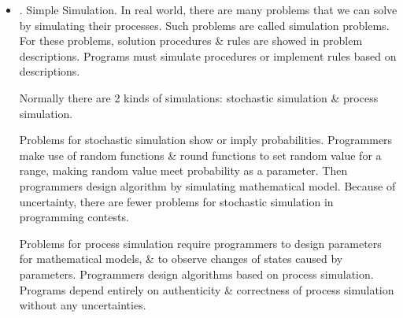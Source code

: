 \documentclass{article}
\newtheorem{problem}{Problem}
\begin{document}
\begin{itemize}
\begin{itemize}
\begin{itemize}
\begin{problem}[Sum of consecutive prime numbers]
				IDs for online judges: POJ 2739, UVA 3399.
			\end{problem}
			{\it Analysis.} Because program needs to deal with consecutive prime numbers for each test case, \& upper limit of prime numbers is $10000$, offline method can be used to solve problem. 1st, all prime numbers $< 10001$ are obtained \& stored in array {\tt prime[1 .. total]} in ascending order. Then deal with test cases 1 by 1: Suppose input number is $n$; sum of consecutive prime numbers is {\tt cnt}; number of representation for {\tt cnt == n} is {\tt ans}. A double loop is used to get number of representations for $n$:
			\begin{itemize}
				\item Outer loop $i$: {\tt for(int i = 0; n >= prime[i]; i++)} enumerates all possible minimum {\tt prime[i]}.
				\item Inner loop $j$: \verb|for(int j = i; j < total && cnt < n; j++), cnt += prime[j]|, is to calculate sum of consecutive prime numbers. If ${\tt cnt}\ge n$, then loop ends, \& if {\tt cnt == n}, then number of representations is {\tt ans++}.
			\end{itemize}
			When outer loop ends, {\tt ans} is solution to test case.
		\end{itemize}
		\item {. Simple Simulation.} In real world, there are many problems that we can solve by simulating their processes. Such problems are called simulation problems. For these problems, solution procedures \& rules are showed in problem descriptions. Programs must simulate procedures or implement rules based on descriptions.
		
		Normally there are 2 kinds of simulations: stochastic simulation \& process simulation.
		
		Problems for stochastic simulation show or imply probabilities. Programmers make use of random functions \& round functions to set random value for a range, making random value meet probability as a parameter. Then programmers design algorithm by simulating mathematical model. Because of uncertainty, there are fewer problems for stochastic simulation in programming contests.
		
		Problems for process simulation require programmers to design parameters for mathematical models, \& to observe changes of states caused by parameters. Programmers design algorithms based on process simulation. Programs depend entirely on authenticity \& correctness of process simulation without any uncertainties.
		

\end{itemize}
\end{itemize}
\end{document}
